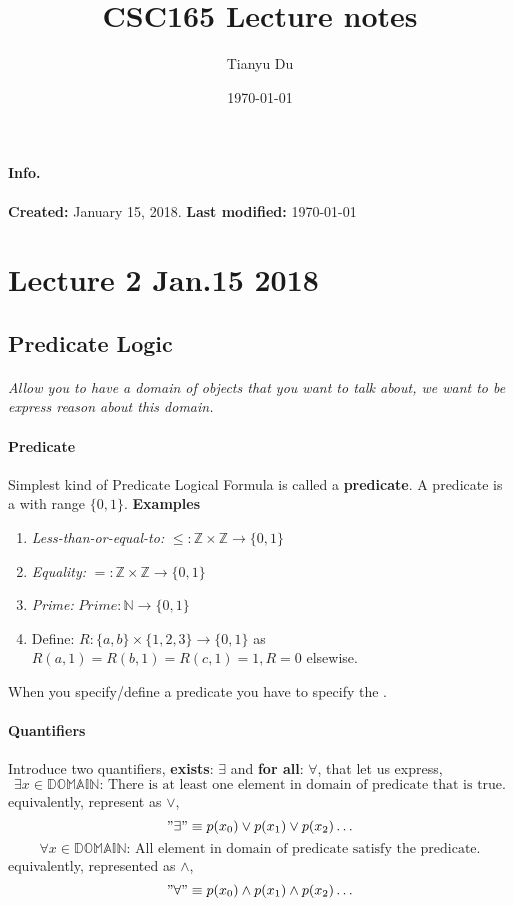 \documentclass{article}
\author{Tianyu Du}
\title{CSC165 Lecture notes}
\date{\today}
\begin{document}
	\maketitle
	\paragraph{Info.}\quad
	\newline
	\textbf{Created: }January 15, 2018.
	\newline \textbf{Last modified: } \today
	\doclicenseThis
	\tableofcontents
	\section{Lecture 2 Jan.15 2018}
	\subsection{Predicate Logic}
	\paragraph{} \emph{Allow you to have a domain of objects that you want to talk about, we want to be express reason about this domain.}
	\paragraph{Predicate} Simplest kind of Predicate Logical Formula is called a \textbf{predicate}. A predicate is a  with range $\{0,1\}$.
	\newline
	\textbf{Examples}
	\begin{enumerate}
		\item \emph{Less-than-or-equal-to:} $\leq : \mathbb{Z} \times \mathbb{Z} \to \{0,1\}$
		\item \emph{Equality: } $=:\mathbb{Z} \times \mathbb{Z} \to \{0,1\}$
		\item \emph{Prime: }$Prime: \mathbb{N} \to \{0,1\}$
		\item Define: $R: \{a,b\} \times \{1,2,3\} \to \{0,1\}$ as $R(a,1) = R(b,1) = R(c,1) = 1, R = 0$ elsewise.
	\end{enumerate}
	When you specify/define a predicate you have to specify the .
	\paragraph{Quantifiers} Introduce two quantifiers, \textbf{exists}: $\exists$ and \textbf{for all}: $\forall$, that let us express,
	\[
	\exists x \in \mathbb{DOMAIN} \text{: There is at least one element in domain of predicate that is true.}
	\]
	equivalently, represent as $\lor$,
	\[
	"\exists" \equiv {p(x_0) \lor p(x_1) \lor p(x_2) \dots}
	\]
	\[
	\forall x \in \mathbb{DOMAIN} \text{: All element in domain of predicate satisfy the predicate.}
	\]
	equivalently, represented as $\land$,
	\[
	"\forall" \equiv {p(x_0) \land p(x_1) \land p(x_2) \dots}
	\]
	
\end{document}
